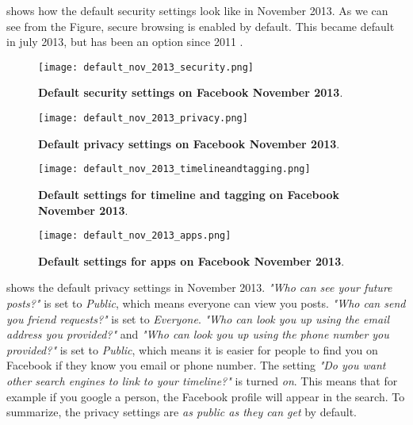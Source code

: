  shows how the default security settings look like in November 2013. As we can see from the Figure, secure browsing is enabled by default. This became default in july 2013, but has been an option since 2011 \cite{secureBrowsing}. 

\begin{figure}[b]
\centering
\texttt{[image: default\_nov\_2013\_security.png]}
\caption[Default security settings on Facebook November 2013]{\textbf{Default security settings on Facebook November 2013}.} 
\label{fig:security2013}
\end{figure}

\begin{figure}[t]
\centering
\texttt{[image: default\_nov\_2013\_privacy.png]}
\caption[Default privacy settings on Facebook November 2013]{\textbf{Default privacy settings on Facebook November 2013}.} 
\label{fig:privacy2013}
\end{figure}

\begin{figure}[b]
\centering
\texttt{[image: default\_nov\_2013\_timelineandtagging.png]}
\caption[Default settings for timeline and tagging on Facebook November 2013]{\textbf{Default settings for timeline and tagging on Facebook November 2013}.} 
\label{fig:timelineandtagging2013}
\end{figure}

\begin{figure}[t]
\centering
\texttt{[image: default\_nov\_2013\_apps.png]}
\caption[Default settings for apps on Facebook November 2013]{\textbf{Default  settings for apps on Facebook November 2013}.} 
\label{fig:apps2013}
\end{figure}

 shows the default privacy settings in November 2013.  \textit{"Who can see your future posts?"} is set to \textit{Public}, which means everyone can view you posts. \textit{"Who can send you friend requests?"} is set to \textit{Everyone}. \textit{"Who can look you up using the email address you provided?"} and \textit{"Who can look you up using the phone number you provided?"} is set to \textit{Public}, which means it is easier for people to find you on Facebook if they know you email or phone number. The setting \textit{"Do you want other search engines to link to your timeline?"} is turned \textit{on}. This means that for example if you google a person, the Facebook profile will appear in the search. To summarize, the privacy settings are \textit{as public as they can get} by default. 

